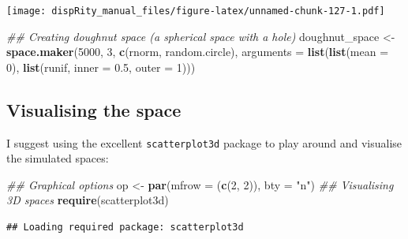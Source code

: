 \documentclass[]{book}
\newenvironment{Shaded}{\begin{snugshade}}{\end{snugshade}}
\newcommand{\CommentTok}[1]{\textcolor[rgb]{0.56,0.35,0.01}{\textit{#1}}}
\newcommand{\DataTypeTok}[1]{\textcolor[rgb]{0.13,0.29,0.53}{#1}}
\newcommand{\DecValTok}[1]{\textcolor[rgb]{0.00,0.00,0.81}{#1}}
\newcommand{\FloatTok}[1]{\textcolor[rgb]{0.00,0.00,0.81}{#1}}
\newcommand{\KeywordTok}[1]{\textcolor[rgb]{0.13,0.29,0.53}{\textbf{#1}}}
\newcommand{\NormalTok}[1]{#1}
\newcommand{\StringTok}[1]{\textcolor[rgb]{0.31,0.60,0.02}{#1}}
\begin{document}
\texttt{[image: dispRity\_manual\_files/figure-latex/unnamed-chunk-127-1.pdf]}

\begin{Shaded}
\begin{Highlighting}[]
\CommentTok{## Creating doughnut space (a spherical space with a hole)}
\NormalTok{doughnut_space <-}\StringTok{ }\KeywordTok{space.maker}\NormalTok{(}\DecValTok{5000}\NormalTok{, }\DecValTok{3}\NormalTok{, }\KeywordTok{c}\NormalTok{(rnorm, random.circle),}
     \DataTypeTok{arguments =} \KeywordTok{list}\NormalTok{(}\KeywordTok{list}\NormalTok{(}\DataTypeTok{mean =} \DecValTok{0}\NormalTok{),}
                      \KeywordTok{list}\NormalTok{(runif, }\DataTypeTok{inner =} \FloatTok{0.5}\NormalTok{, }\DataTypeTok{outer =} \DecValTok{1}\NormalTok{)))}
\end{Highlighting}
\end{Shaded}

\hypertarget{visualising-the-space}{%
\subsection{Visualising the space}\label{visualising-the-space}}

I suggest using the excellent \texttt{scatterplot3d} package to play around and visualise the simulated spaces:

\begin{Shaded}
\begin{Highlighting}[]
\CommentTok{## Graphical options}
\NormalTok{op <-}\StringTok{ }\KeywordTok{par}\NormalTok{(}\DataTypeTok{mfrow =}\NormalTok{ (}\KeywordTok{c}\NormalTok{(}\DecValTok{2}\NormalTok{, }\DecValTok{2}\NormalTok{)), }\DataTypeTok{bty =} \StringTok{"n"}\NormalTok{)}
\CommentTok{## Visualising 3D spaces}
\KeywordTok{require}\NormalTok{(scatterplot3d)}
\end{Highlighting}
\end{Shaded}

\begin{verbatim}
## Loading required package: scatterplot3d
\end{verbatim}
\end{document}
